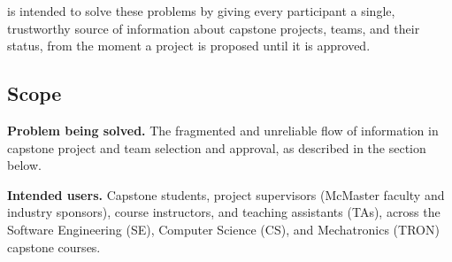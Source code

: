 \documentclass[12pt]{article}
\newcounter{sn}
\newcounter{esn}
\newcounter{tin}
\begin{document}
  \projname{} is intended to solve these problems by giving every participant a single, trustworthy
  source of information about capstone projects, teams, and their status, from the moment a project
  is proposed until it is approved.

  \subsection{Scope}
  \label{sec:scope}


\textbf{Problem being solved.} The fragmented and unreliable flow of information in capstone
  project and team selection and approval, as described in the  section below.

  \textbf{Intended users.} Capstone students, project supervisors (McMaster faculty and industry
  sponsors), course instructors, and teaching assistants (TAs), across the Software Engineering (SE),
  Computer Science (CS), and Mechatronics (TRON) capstone courses.
\end{document}
